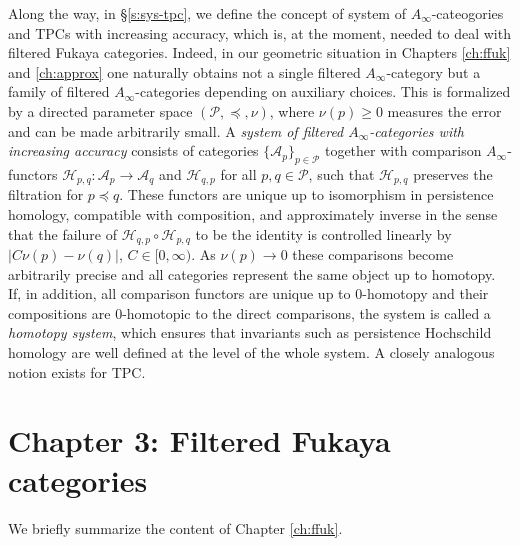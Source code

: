 Along the way, in \S\ref{s:sys-tpc}, we define the concept of system of $A_\infty$-cateogories and TPCs with increasing accuracy, which is, at the moment, needed to deal with filtered Fukaya categories.
Indeed, in our geometric situation in Chapters \ref{ch:ffuk} and \ref{ch:approx} one naturally obtains not a single filtered
$A_\infty$-category but a family of filtered $A_\infty$-categories
depending on auxiliary choices. This is formalized by a directed parameter space
$(\mathcal{P},\preceq,\nu)$, where $\nu(p)\ge 0$ measures the error and can
be made arbitrarily small. A \emph{system of filtered $A_\infty$-categories
with increasing accuracy} consists of categories
$\{\mathcal{A}_p\}_{p\in\mathcal{P}}$ together with comparison
$A_\infty$-functors $\mathcal{H}_{p,q}\colon \mathcal{A}_p\to \mathcal{A}_q$ and $\mathcal{H}_{q,p}$ for all $p,q\in \mathcal{P}$, such that $\mathcal{H}_{p,q}$ preserves the filtration for $p\preceq q$. These functors are unique up to
isomorphism in persistence homology, compatible with composition, and
approximately inverse in the sense that the failure of
$\mathcal{H}_{q,p}\circ\mathcal{H}_{p,q}$ to be the identity is controlled
linearly by $|C\nu(p)-\nu(q)|$, $C\in[0,\infty)$. As $\nu(p)\to 0$ these comparisons become arbitrarily precise
and all categories represent the same object up to homotopy. If, in
addition, all comparison functors are unique up to $0$-homotopy and their
compositions are $0$-homotopic to the direct comparisons, the system is
called a \emph{homotopy system}, which ensures that invariants such as
persistence Hochschild homology are well defined at the level of the
whole system. A closely analogous notion exists for TPC.


\section{Chapter 3: Filtered Fukaya categories}
We briefly summarize the content of Chapter \ref{ch:ffuk}.

